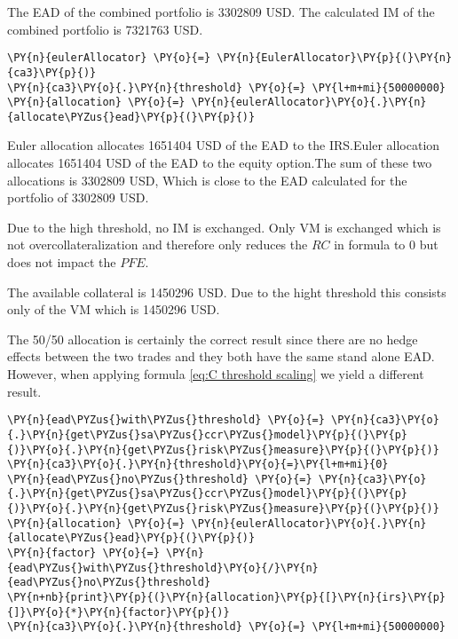     The EAD of the combined portfolio is 3302809 USD. The calculated IM of
the combined portfolio is 7321763 USD.

    
    \begin{tcolorbox}[breakable, size=fbox, boxrule=1pt, pad at break*=1mm,colback=cellbackground, colframe=cellborder]
\begin{Verbatim}[commandchars=\\\{\}]
\PY{n}{eulerAllocator} \PY{o}{=} \PY{n}{EulerAllocator}\PY{p}{(}\PY{n}{ca3}\PY{p}{)}
\PY{n}{ca3}\PY{o}{.}\PY{n}{threshold} \PY{o}{=} \PY{l+m+mi}{50000000}
\PY{n}{allocation} \PY{o}{=} \PY{n}{eulerAllocator}\PY{o}{.}\PY{n}{allocate\PYZus{}ead}\PY{p}{(}\PY{p}{)}
\end{Verbatim}
\end{tcolorbox}

    Euler allocation allocates 1651404 USD of the EAD to the IRS.Euler
allocation allocates 1651404 USD of the EAD to the equity option.The sum
of these two allocations is 3302809 USD, Which is close to the EAD
calculated for the portfolio of 3302809 USD.

    
    Due to the high threshold, no IM is exchanged. Only VM is exchanged
which is not overcollateralization and therefore only reduces the \(RC\)
in formula  to 0 but does not impact the
\(PFE\).

    The available collateral is 1450296 USD. Due to the hight threshold this
consists only of the VM which is 1450296 USD.

    
    The 50/50 allocation is certainly the correct result since there are no
hedge effects between the two trades and they both have the same stand
alone EAD. However, when applying formula \ref{eq:C threshold scaling}
we yield a different result.

    \begin{tcolorbox}[breakable, size=fbox, boxrule=1pt, pad at break*=1mm,colback=cellbackground, colframe=cellborder]
\begin{Verbatim}[commandchars=\\\{\}]
\PY{n}{ead\PYZus{}with\PYZus{}threshold} \PY{o}{=} \PY{n}{ca3}\PY{o}{.}\PY{n}{get\PYZus{}sa\PYZus{}ccr\PYZus{}model}\PY{p}{(}\PY{p}{)}\PY{o}{.}\PY{n}{get\PYZus{}risk\PYZus{}measure}\PY{p}{(}\PY{p}{)}
\PY{n}{ca3}\PY{o}{.}\PY{n}{threshold}\PY{o}{=}\PY{l+m+mi}{0}
\PY{n}{ead\PYZus{}no\PYZus{}threshold} \PY{o}{=} \PY{n}{ca3}\PY{o}{.}\PY{n}{get\PYZus{}sa\PYZus{}ccr\PYZus{}model}\PY{p}{(}\PY{p}{)}\PY{o}{.}\PY{n}{get\PYZus{}risk\PYZus{}measure}\PY{p}{(}\PY{p}{)}
\PY{n}{allocation} \PY{o}{=} \PY{n}{eulerAllocator}\PY{o}{.}\PY{n}{allocate\PYZus{}ead}\PY{p}{(}\PY{p}{)}
\PY{n}{factor} \PY{o}{=} \PY{n}{ead\PYZus{}with\PYZus{}threshold}\PY{o}{/}\PY{n}{ead\PYZus{}no\PYZus{}threshold}
\PY{n+nb}{print}\PY{p}{(}\PY{n}{allocation}\PY{p}{[}\PY{n}{irs}\PY{p}{]}\PY{o}{*}\PY{n}{factor}\PY{p}{)}
\PY{n}{ca3}\PY{o}{.}\PY{n}{threshold} \PY{o}{=} \PY{l+m+mi}{50000000}
\end{Verbatim}
\end{tcolorbox}

